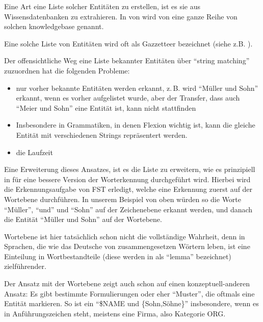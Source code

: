 \documentclass[
german,
]{bachelor}
\begin{document}
Eine Art eine Liste solcher Entitäten zu erstellen,
ist es sie aus Wissensdatenbanken %
zu extrahieren.
In \autocite[A.1]{2006.15509} von 
wird von \citeauthor{2006.15509} eine ganze Reihe von solchen knowledgebase %
genannt.

Eine solche Liste von Entitäten wird oft als Gazzetteer bezeichnet %
(siehe z.B. \autocite[Introduction]{Carlson2009}).



Der offensichtliche Weg eine Liste bekannter Entitäten über \enquote{string matching} zuzuordnen
hat die folgenden Probleme:
\begin{itemize}
	\item nur vorher bekannte Entitäten werden erkannt, 
	z.\,B. wird \enquote{Müller und Sohn} erkannt, 
	wenn es vorher aufgelistet wurde,
	aber der Transfer,
	dass auch \enquote{Meier und Sohn} eine Entität ist,
	kann nicht stattfinden
	\item Insbesondere in Grammatiken, 
	in denen Flexion %
	wichtig ist,
	kann die gleiche Entität mit verschiedenen Strings repräsentert werden.
	\item die Laufzeit
\end{itemize}

Eine Erweiterung dieses Ansatzes,
ist es die Liste zu erweitern,
wie es prinzipiell in \autocite[Abschnitt 3.4]{OASIcs-LDK-2019-11} 
für eine bessere Version der Worterkennung durchgeführt wird.
Hierbei wird die Erkennungsaufgabe von FST %
erledigt,
welche eine Erkennung zuerst auf der Wortebene durchführen.
In unserem Beispiel von oben würden so die Worte 
\enquote{Müller}, \enquote{und} und \enquote{Sohn} auf der Zeichenebene erkannt werden,
und danach die Entität \enquote{Müller und Sohn} auf der Wortebene.

Wortebene ist hier tatsächlich schon nicht die vollständige Wahrheit,
denn in Sprachen,
die wie das Deutsche von zusammengesetzen Wörtern leben,
ist eine Einteilung in Wortbestandteile
(diese werden in \autocite{OASIcs-LDK-2019-11} als \foreignquote{english}{lemma} bezeichnet)
zielführender.


Der Ansatz mit der Wortebene zeigt auch schon auf einen konzeptuell-anderen Ansatz:
Es gibt bestimmte Formulierungen oder eher \enquote{Muster},
die oftmals eine Entität markieren.
So ist ein \enquote{\$NAME und \{Sohn,Söhne\}} insbesondere, 
wenn es in Anführungszeichen steht,
meistens eine Firma, also Kategorie ORG. %
\end{document}
